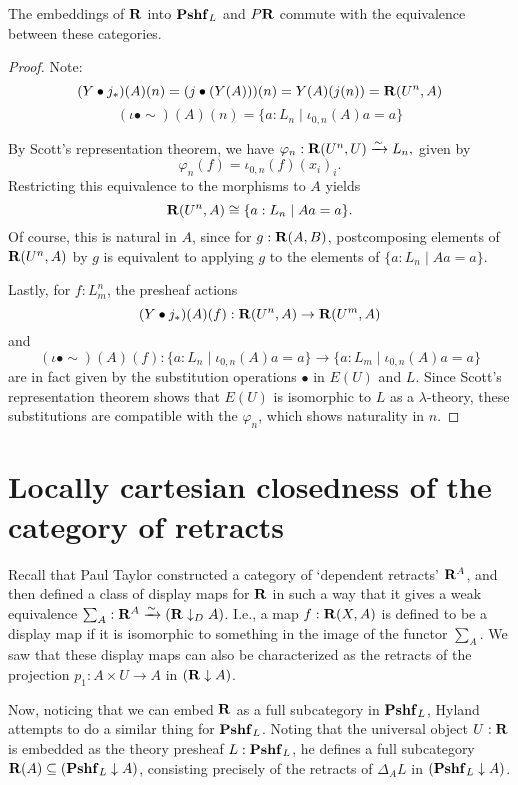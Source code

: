 \begin{lemma}
  The embeddings of $ \mathbf{R} $ into $ \mathbf{Pshf}_{L} $ and $ P \mathbf{R} $ commute with the equivalence between these categories.
\end{lemma}
\begin{proof}
  Note:
  \[ (Y \bullet j_*)(A)(n) = (j \bullet (Y(A)))(n) = Y(A)(j(n)) = \mathbf{R}(U^n, A) \]
  \[ (\iota \bullet \sim)(A)(n) = \{ a : L_n \mid \iota_{0, n}(A) a = a \} \]

  By Scott's representation theorem, we have $ \varphi_n: \mathbf{R}(U^n, U) \xrightarrow \sim L_n, $ given by
  \[ \varphi_n(f) = \iota_{0, n}(f) (x_i)_i. \]
  Restricting this equivalence to the morphisms to $ A $ yields
  \[ \mathbf{R}(U^n, A) \cong \{ a : L_n \mid A a = a \}. \]
  Of course, this is natural in $ A $, since for $ g: \mathbf{R}(A, B) $, postcomposing elements of $ \mathbf{R}(U^n, A) $ by $ g $ is equivalent to applying $ g $ to the elements of $ \{ a : L_n \mid A a = a \} $.

  Lastly, for $ f : L_m^n $, the presheaf actions
  \[ (Y \bullet j_*)(A)(f) : \mathbf{R}(U^n, A) \to \mathbf{R}(U^m, A) \]
  and
  \[ (\iota \bullet \sim)(A)(f) : \{ a : L_n \mid \iota_{0, n}(A) a = a \} \to \{ a : L_m \mid \iota_{0, n}(A) a = a \} \]
  are in fact given by the substitution operations $ \bullet $ in $ E(U) $ and $ L $. Since Scott's representation theorem shows that $ E(U) $ is isomorphic to $ L $ as a $ \lambda $-theory, these substitutions are compatible with the $ \varphi_n $, which shows naturality in $ n $.
\end{proof}

\section{Locally cartesian closedness of the category of retracts}

Recall that Paul Taylor constructed a category of `dependent retracts' $ \mathbf{R}^A $, and then defined a class of display maps for $ \mathbf{R} $ in such a way that it gives a weak equivalence $ \sum_A : \mathbf{R}^A \xrightarrow{\sim} (\mathbf{R} \downarrow_D A) $. I.e., a map $ f: \mathbf{R}(X, A) $ is defined to be a display map if it is isomorphic to something in the image of the functor $ \sum_A $. We saw that these display maps can also be characterized as the retracts of the projection $ p_1: A \times U \to A $ in $ (\mathbf{R} \downarrow A) $.

Now, noticing that we can embed $ \mathbf{R} $ as a full subcategory in $ \mathbf{Pshf}_{L} $, Hyland attempts to do a similar thing for $ \mathbf{Pshf}_{L} $. Noting that the universal object $ U : \mathbf{R} $ is embedded as the theory presheaf $ L : \mathbf{Pshf}_{L} $, he defines a full subcategory $ \mathbf{R}(A) \subseteq (\mathbf{Pshf}_{L} \downarrow A) $, consisting precisely of the retracts of $ \Delta_A L $ in $ (\mathbf{Pshf}_{L} \downarrow A) $.

